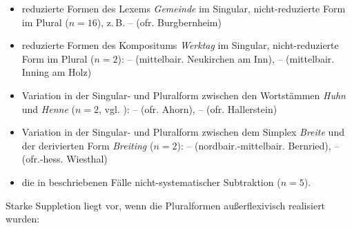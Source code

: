 \begin{itemize}\sloppy
\item reduzierte Formen des Lexems \textit{Gemeinde} im Singular, nicht-reduzierte Form im Plural ($n=16$), z.\,B.  --  (ofr. Burgbernheim)
\item reduzierte Formen des Kompositums \textit{Werktag} im Singular, nicht-reduzierte Form im Plural ($n=2$):  --  (mittelbair. Neukirchen am Inn),  --  (mittelbair. Inning am Holz)
\item Variation in der Singular- und Pluralform zwischen den Wortstämmen \textit{Huhn} und \textit{Henne} ($n=2$, vgl. \citealt[129]{Rowley1997}):  --  (ofr. Ahorn),  --  (ofr. Hallerstein)
\item Variation in der Singular- und Pluralform zwischen dem Simplex \textit{Breite} und der derivierten Form \textit{Breiting} ($n=2$):   --  (nordbair.-mittelbair. Bernried),  --  (ofr.-hess. Wiesthal)
\item die in  beschriebenen Fälle nicht-systematischer Subtraktion ($n=5$).
\end{itemize}

Starke Suppletion liegt vor, wenn die Pluralformen außerflexivisch realisiert wurden:

